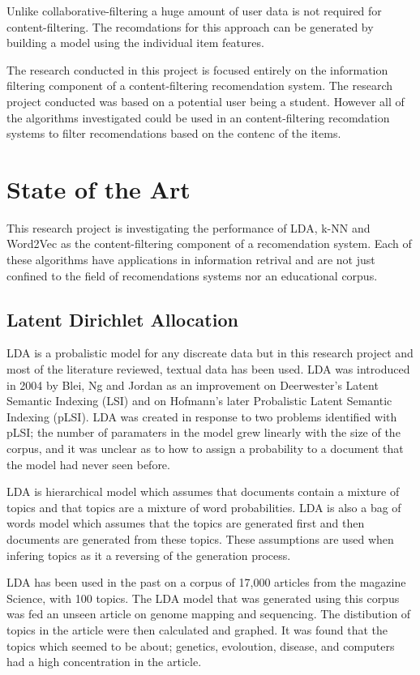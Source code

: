Unlike collaborative-filtering a huge amount of user data is not required for content-filtering.
The recomdations for this approach can be generated by building a model using the individual item features.

The research conducted in this project is focused entirely on the information filtering component of a content-filtering recomendation system.
The research project conducted was based on a potential user being a student.
However all of the algorithms investigated could be used in an content-filtering recomdation systems to filter recomendations based on the contenc of the items.

\section{State of the Art}
This research project is investigating the performance of LDA, k-NN and Word2Vec as the content-filtering component of a recomendation system.
Each of these algorithms have applications in information retrival and are not just confined to the field of recomendations systems nor an educational corpus.

\subsection{Latent Dirichlet Allocation}
LDA is a probalistic model for any discreate data but in this research project and most of the literature reviewed, textual data has been used.
LDA was introduced in 2004 by Blei, Ng and Jordan as an improvement on Deerwester's Latent Semantic Indexing (LSI) and on Hofmann's later Probalistic Latent Semantic Indexing (pLSI).
LDA was created in response to two problems identified with pLSI; the number of paramaters in the model grew linearly with the size of the corpus, and it was unclear as to how to assign a probability to a document that the model had never seen before.

LDA is hierarchical model which assumes that documents contain a mixture of topics and that topics are a mixture of word probabilities.
LDA is also a bag of words model which assumes that the topics are generated first and then documents are generated from these topics.
These assumptions are used when infering topics as it a reversing of the generation process.

LDA has been used in the past on a corpus of 17,000 articles from the magazine Science, with 100 topics.
The LDA model that was generated using this corpus was fed an unseen article on genome mapping and sequencing.
The distibution of topics in the article were then calculated and graphed.
It was found that the topics which seemed to be about; genetics, evoloution, disease, and computers had a high concentration in the article.

